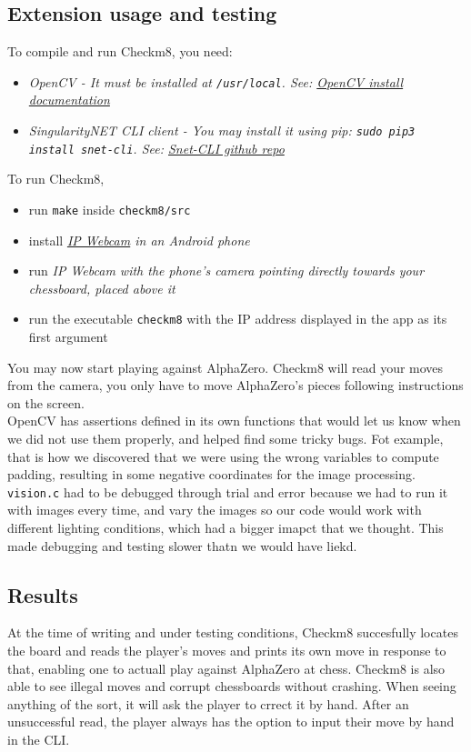 \documentclass[11pt]{article}
\begin{document}
\subsection{Extension usage and testing}
To compile and run Checkm8, you need:
\begin{itemize}
\item \em OpenCV \em - It must be installed at
\texttt{/usr/local}. See:
\href{https://docs.opencv.org/3.4.6/d7/d9f/tutorial_linux_install.html}{OpenCV install documentation}
\item  \em SingularityNET CLI \em client - You may install it using \em pip\em: 
\texttt{sudo pip3 install snet-cli}. See: 
\href{https://github.com/singnet/snet-cli}{Snet-CLI github repo}

\end{itemize}
To run Checkm8, 
\begin{itemize}
  \item run \texttt{make} inside \texttt{checkm8/src} 
  \item install \em \href{https://play.google.com/store/apps/details?id=com.pas.webcam&hl=en_GB}{IP Webcam} \em
  in an Android phone
  \item run \em IP Webcam \em with the phone's camera pointing directly towards your chessboard,
  placed above it
  \item run the executable \texttt{checkm8} with the IP address displayed
  in the app as its first argument
\end{itemize}
You may now start playing against AlphaZero. Checkm8 will read your moves
from the camera, you only have to move AlphaZero's pieces following 
instructions on the screen.\\
OpenCV has assertions defined in its own functions that would let us 
know when we did not use them properly, and helped find some tricky bugs.
Fot example, that is how we discovered that we were using the wrong variables
to compute padding, resulting in some negative coordinates for the image
processing.\\
\texttt{vision.c} had to be debugged through trial and error because we
had to run it with images every time, and vary the images so our code would
work with different lighting conditions, which had a bigger imapct that we 
thought. This made debugging and testing slower thatn we would have liekd.\\
\subsection{Results}
At the time of writing and under testing conditions,
Checkm8 succesfully locates the board and reads the
player's moves and prints its own move in response to that, enabling
one to actuall play against AlphaZero at chess. Checkm8 is also able to 
see illegal moves and corrupt chessboards without crashing. When seeing
anything of the sort, it will ask the player to crrect it by hand. After an
unsuccessful read, the player always has the option to input their move by 
hand in the CLI.\\
\end{document}
